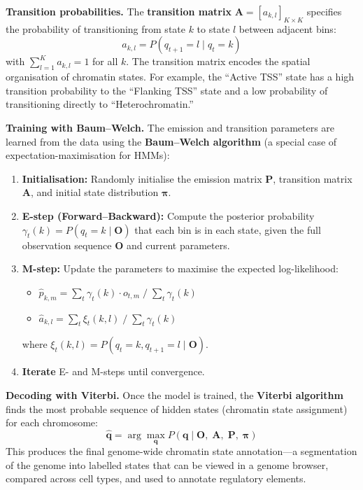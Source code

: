 \textbf{Transition probabilities.} The \textbf{transition matrix} $\mathbf{A} = [a_{k,l}]_{K \times K}$ specifies the probability of transitioning from state $k$ to state $l$ between adjacent bins:
\begin{equation}
\label{eq:histones:chromhmm-transition}
a_{k,l} = P(q_{t+1} = l \mid q_t = k)
\end{equation}
with $\sum_{l=1}^{K} a_{k,l} = 1$ for all $k$. The transition matrix encodes the spatial organisation of chromatin states. For example, the ``Active TSS'' state has a high transition probability to the ``Flanking TSS'' state and a low probability of transitioning directly to ``Heterochromatin.''

\textbf{Training with Baum--Welch.} The emission and transition parameters are learned from the data using the \textbf{Baum--Welch algorithm} (a special case of expectation-maximisation for HMMs):
\begin{enumerate}[itemsep=2pt]
  \item \textbf{Initialisation:} Randomly initialise the emission matrix $\mathbf{P}$, transition matrix $\mathbf{A}$, and initial state distribution $\boldsymbol{\pi}$.
  \item \textbf{E-step (Forward--Backward):} Compute the posterior probability $\gamma_t(k) = P(q_t = k \mid \mathbf{O})$ that each bin is in each state, given the full observation sequence $\mathbf{O}$ and current parameters.
  \item \textbf{M-step:} Update the parameters to maximise the expected log-likelihood:
  \begin{itemize}[itemsep=1pt]
    \item $\hat{p}_{k,m} = \sum_t \gamma_t(k) \cdot o_{t,m} \;/\; \sum_t \gamma_t(k)$
    \item $\hat{a}_{k,l} = \sum_t \xi_t(k,l) \;/\; \sum_t \gamma_t(k)$
  \end{itemize}
  where $\xi_t(k,l) = P(q_t = k, q_{t+1} = l \mid \mathbf{O})$.
  \item \textbf{Iterate} E- and M-steps until convergence.
\end{enumerate}

\textbf{Decoding with Viterbi.} Once the model is trained, the \textbf{Viterbi algorithm} finds the most probable sequence of hidden states (chromatin state assignment) for each chromosome:
\begin{equation}
\label{eq:histones:chromhmm-viterbi}
\hat{\mathbf{q}} = \arg\max_{\mathbf{q}} P(\mathbf{q} \mid \mathbf{O},\; \mathbf{A},\; \mathbf{P},\; \boldsymbol{\pi})
\end{equation}
This produces the final genome-wide chromatin state annotation---a segmentation of the genome into labelled states that can be viewed in a genome browser, compared across cell types, and used to annotate regulatory elements.

